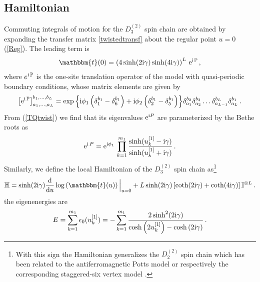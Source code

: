 \documentclass[12pt]{article}
\numberwithin{equation}{section}
\newcommand{\BR}[2]{u^{[#1]}_{#2}}
\newcommand{\ri}{{\rm i}}
\newcommand{\re}{{\rm e}}
\newcommand{\id}{\mathbb{I}}
\begin{document}
\subsection{Hamiltonian}

Commuting integrals of motion for the $D^{(2)}_3$ spin chain are obtained by expanding the transfer matrix \eqref{twistedtransf} about the regular point $u=0$ (\ref{Reg}).  The leading term is
\begin{align}
    \mathbbm{t}(0) = \left(4\sinh(2\ri \gamma)\sinh(4\ri \gamma)\right)^L\,\re^{\ri\, \mathbb{P}} \,,
\end{align}
where $e^{\ri\, \mathbb{P}}$ is the one-site translation operator of the model with quasi-periodic boundary conditions, whose matrix elements are given by
\begin{align}
    \left[\re^{\ri\, \mathbb{P}}\right]^{b_1,\dots,b_L}_{a_1,\dots,a_L}=\exp{\left\{\ri \phi_1 \left(\delta^{b_1}_1-\delta^{b_1}_6\right)+\ri \phi_2 \left(\delta^{b_1}_2-\delta^{b_1}_5\right)\right\}}\delta^{b_2}_{a_1}\delta^{b_3}_{a_2} \dots \delta^{b_L}_{a_{L-1}}\delta^{b_1}_{a_L}\,.
    \label{onesiteshift}
\end{align}
From (\ref{TQtwist}) we find that its eigenvalues $\re^{\ri P}$ are parameterized by the Bethe roots as
\begin{align}
    \re^{\ri\, P}=\re^{\ri \phi_1}\,\prod^{m_1}_{k=1} \frac{\sinh(\BR{1}{k}-\ri \gamma)}{\sinh(\BR{1}{k}+\ri \gamma)} \, .
\end{align}
Similarly, we define the local Hamiltonian of the $D^{(2)}_3$ spin chain as\footnote{With this sign the Hamiltonian generalizes the $D^{(2)}_2$ spin chain which has been related to the antiferromagnetic Potts model \cite{RPJS20} or respectively the corresponding staggered-six vertex model \cite{NeRe21a,FrGe22} .}
\begin{align}
  \label{eq:Hamil}
    \mathbb{H}= \sinh(2\ri \gamma) \frac{\mathrm{d}}{\mathrm{d}u} \log\left(\mathbbm{t}(u)\right)\Big\vert_{u=0} +L\sinh(2\ri \gamma)\left[\coth(2\ri \gamma)+\coth(4\ri \gamma)
    \right] \id^{\otimes L}\,.
\end{align}
the eigenenergies are
\begin{align}
    E=\sum^{m_1}_{k=1} \epsilon_0(u^{[1]}_k)=-\sum^{m_1}_{k=1}\frac{2\sinh^2(2\ri \gamma)}{\cosh\left(2\BR{1}{k}\right)-\cosh\left(2\ri \gamma\right)}\,.\label{Energy}
\end{align}
\end{document}
